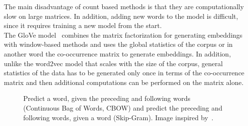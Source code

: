 The main disadvantage of count based methods is that they are computationally slow on large matrices. In addition, adding new words to the model is difficult, since it requires training a new model from the start.\\
The GloVe model~  combines the matrix factorization for generating embeddings with window-based methods and uses the global statistics of the corpus or in another word the co-occurrence matrix to generate embeddings. In addition, unlike the word2vec model that scales with the size of the corpus, general statistics of the data has to be generated only once in terms of the co-occurrence matrix and then additional computations can be performed on the matrix alone.
\begin{figure}
\centering 
\resizebox{0.63\textwidth}{0.5\textwidth}{      

}
\caption{Predict a word, given the preceding and following words (Continuous Bag of Words, CBOW) and predict the preceding and following words, given a word (Skip-Gram). Image inspired by~.}
\label{fig:w2v}
\end{figure}
